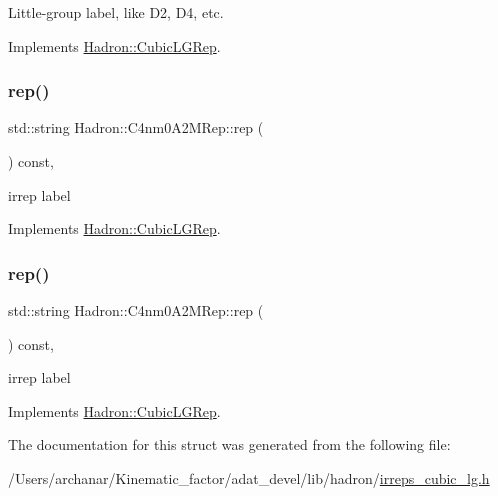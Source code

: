 Little-\/group label, like D2, D4, etc. 

Implements \mbox{\hyperlink{structHadron_1_1CubicLGRep_a9bdb14b519a611d21379ed96a3a9eb41}{Hadron\+::\+Cubic\+L\+G\+Rep}}.

\mbox{\label{structHadron_1_1C4nm0A2MRep_a32eaa35da406679229721f90a391ff76}} 
\subsubsection{\texorpdfstring{rep()}{rep()}\hspace{0.1cm}{\footnotesize\ttfamily [1/2]}}
{\footnotesize\ttfamily std\+::string Hadron\+::\+C4nm0\+A2\+M\+Rep\+::rep (\begin{DoxyParamCaption}{ }\end{DoxyParamCaption}) const\hspace{0.3cm}{\ttfamily [inline]}, {\ttfamily [virtual]}}

irrep label 

Implements \mbox{\hyperlink{structHadron_1_1CubicLGRep_a50f5ddbb8f4be4cee0106fa9e8c75e6c}{Hadron\+::\+Cubic\+L\+G\+Rep}}.

\mbox{\label{structHadron_1_1C4nm0A2MRep_a32eaa35da406679229721f90a391ff76}} 
\subsubsection{\texorpdfstring{rep()}{rep()}\hspace{0.1cm}{\footnotesize\ttfamily [2/2]}}
{\footnotesize\ttfamily std\+::string Hadron\+::\+C4nm0\+A2\+M\+Rep\+::rep (\begin{DoxyParamCaption}{ }\end{DoxyParamCaption}) const\hspace{0.3cm}{\ttfamily [inline]}, {\ttfamily [virtual]}}

irrep label 

Implements \mbox{\hyperlink{structHadron_1_1CubicLGRep_a50f5ddbb8f4be4cee0106fa9e8c75e6c}{Hadron\+::\+Cubic\+L\+G\+Rep}}.



The documentation for this struct was generated from the following file\+:\begin{DoxyCompactItemize}
\item 
/\+Users/archanar/\+Kinematic\+\_\+factor/adat\+\_\+devel/lib/hadron/\mbox{\hyperlink{lib_2hadron_2irreps__cubic__lg_8h}{irreps\+\_\+cubic\+\_\+lg.\+h}}\end{DoxyCompactItemize}
